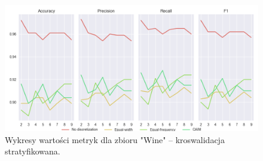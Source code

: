 \begin{figure}[H]
\center
    \includegraphics[width=\textwidth]{img/cv_scores_stratifiedkfold/scoring_stratifiedkfold_wine.png}
    \caption{Wykresy wartości metryk dla zbioru "Wine" -- kroswalidacja stratyfikowana.}
\end{figure}

